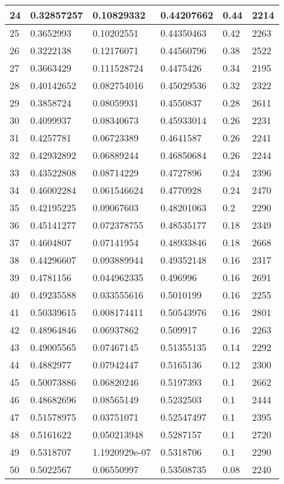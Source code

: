 \begin{longtable}{|l|l|l|l|l|l|}
24 & 0.32857257 & 0.10829332 & 0.44207662 & 0.44 & 2214 \\ \hline 
25 & 0.3652993 & 0.10202551 & 0.44350463 & 0.42 & 2263 \\ \hline 
26 & 0.3222138 & 0.12176071 & 0.44560796 & 0.38 & 2522 \\ \hline 
27 & 0.3663429 & 0.111528724 & 0.4475426 & 0.34 & 2195 \\ \hline 
28 & 0.40142652 & 0.082754016 & 0.45029536 & 0.32 & 2322 \\ \hline 
29 & 0.3858724 & 0.08059931 & 0.4550837 & 0.28 & 2611 \\ \hline 
30 & 0.4099937 & 0.08340673 & 0.45933014 & 0.26 & 2231 \\ \hline 
31 & 0.4257781 & 0.06723389 & 0.4641587 & 0.26 & 2241 \\ \hline 
32 & 0.42932892 & 0.06889244 & 0.46850684 & 0.26 & 2244 \\ \hline 
33 & 0.43522808 & 0.08714229 & 0.4727896 & 0.24 & 2396 \\ \hline 
34 & 0.46002284 & 0.061546624 & 0.4770928 & 0.24 & 2470 \\ \hline 
35 & 0.42195225 & 0.09067603 & 0.48201063 & 0.2 & 2290 \\ \hline 
36 & 0.45141277 & 0.072378755 & 0.48535177 & 0.18 & 2349 \\ \hline 
37 & 0.4604807 & 0.07141954 & 0.48933846 & 0.18 & 2668 \\ \hline 
38 & 0.44296607 & 0.093889944 & 0.49352148 & 0.16 & 2317 \\ \hline 
39 & 0.4781156 & 0.044962335 & 0.496996 & 0.16 & 2691 \\ \hline 
40 & 0.49235588 & 0.033555616 & 0.5010199 & 0.16 & 2255 \\ \hline 
41 & 0.50339615 & 0.008174411 & 0.50543976 & 0.16 & 2801 \\ \hline 
42 & 0.48964846 & 0.06937862 & 0.509917 & 0.16 & 2263 \\ \hline 
43 & 0.49005565 & 0.07467145 & 0.51355135 & 0.14 & 2292 \\ \hline 
44 & 0.4882977 & 0.07942447 & 0.5165136 & 0.12 & 2300 \\ \hline 
45 & 0.50073886 & 0.06820246 & 0.5197393 & 0.1 & 2662 \\ \hline 
46 & 0.48682696 & 0.08565149 & 0.5232503 & 0.1 & 2444 \\ \hline 
47 & 0.51578975 & 0.03751071 & 0.52547497 & 0.1 & 2395 \\ \hline 
48 & 0.5161622 & 0.050213948 & 0.5287157 & 0.1 & 2720 \\ \hline 
49 & 0.5318707 & 1.1920929e-07 & 0.5318706 & 0.1 & 2290 \\ \hline 
50 & 0.5022567 & 0.06550997 & 0.53508735 & 0.08 & 2240 \\ \hline 
\end{longtable}